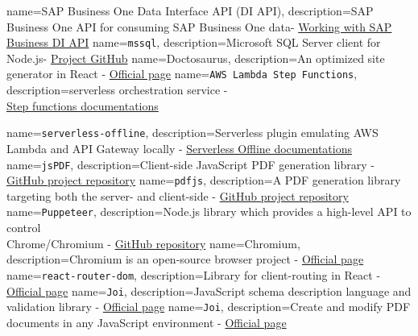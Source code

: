 {
        name=SAP Business One Data Interface API (DI API),
        description={SAP Business One API for consuming SAP Business One data-  \href{https://help.sap.com/doc/saphelpiis_hc_b1_image_repository_development_training_basic_b1_90_tb1300_02_sol_pdf/9.0/en-US/B1_90_TB1300_02_Sol.pdf}{Working with SAP Business DI API}}
}
{
        name=\texttt{mssql},
        description={Microsoft SQL Server client for Node.js-  \href{https://github.com/tediousjs/node-mssql}{Project GitHub}}
}
{
        name=Doctosaurus,
        description={An optimized site generator in React -  \href{https://docusaurus.io/}{Official page}}
}
{
        name=\texttt{AWS Lambda Step Functions},
        description={serverless orchestration service -\\ \href{https://docs.aws.amazon.com/step-functions/latest/dg/welcome.html}{Step functions documentations}}
}

{
        name=\texttt{serverless-offline},
        description={Serverless plugin emulating AWS Lambda and API Gateway locally  - \href{https://www.serverless.com/plugins/serverless-offline}{Serverless Offline documentations}}
}
{
        name=\texttt{jsPDF},
        description={Client-side JavaScript PDF generation library  - \href{https://github.com/parallax/jsPDF}{GitHub project repository}}
}
{
        name=\texttt{pdfjs},
        description={A PDF generation library targeting both the server- and client-side - \href{https://github.com/rkusa/pdfjs?tab=readme-ov-file}{GitHub project repository}}
}
{
        name=\texttt{Puppeteer},
        description={Node.js library which provides a high-level API to control \\Chrome/Chromium - \href{https://github.com/puppeteer/puppeteer}{GitHub repository}}
}
{
        name=Chromium,
        description={Chromium is an open-source browser project - \href{https://www.chromium.org/chromium-projects/}{Official page}}
}
{
        name=\texttt{react-router-dom},
        description={Library for client-routing in React - \href{https://reactrouter.com/en/main}{Official page}}
}
{
        name=\texttt{Joi},
        description={JavaScript schema description language and validation library - \href{https://joi.dev/}{Official page}}
}
{
        name=\texttt{Joi},
        description={Create and modify PDF documents in any JavaScript environment - \href{https://pdf-lib.js.org/}{Official page}}
}